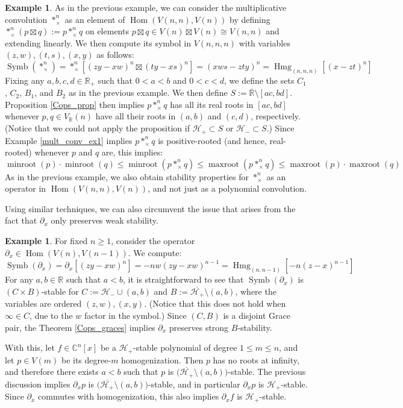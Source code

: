 \documentclass{article}
\theoremstyle{definition}
\newtheorem{example}[theorem]{Example}
\theoremstyle{plain}
\newcommand{\C}{\mathbb{C}}
\newcommand{\R}{\mathbb{R}}
\newcommand{\UHP}{\mathcal{H}_+}
\newcommand{\LHP}{\mathcal{H}_-}
\DeclareMathOperator{\Hmg}{Hmg}
\DeclareMathOperator{\Symb}{Symb}
\DeclareMathOperator{\Hom}{Hom}
\DeclareMathOperator{\maxroot}{maxroot}
\DeclareMathOperator{\minroot}{minroot}
\begin{document}
\begin{example}
    As in the previous example, we can consider the multiplicative convolution $*_\times^n$ as an element of $\Hom(V(n,n),V(n))$ by defining $*_\times^n(p \boxtimes q) := p *_\times^n q$ on elements $p \boxtimes q \in V(n) \boxtimes V(n) \cong V(n,n)$ and extending linearly. We then compute its symbol in $V(n,n,n)$ with variables $(z,w),(t,s),(x,y)$ as follows:
    \[
        \Symb(*_\times^n) = *_\times^n\left[(zy-xw)^n \boxtimes (ty-xs)^n\right] = (xws - zty)^n = \Hmg_{(n,n,n)}\left[(x-zt)^n\right]
    \]
    Fixing any $a,b,c,d \in \R_+$ such that $0<a<b$ and $0<c<d$, we define the sets $C_1$, $C_2$, $B_1$, and $B_2$ as in the previous example. We then define $S := \overline{\R} \setminus [ac, bd]$. Proposition \ref{Cops_prop} then implies $p *_\times^n q$ has all its real roots in $[ac,bd]$ whenever $p,q \in V_\R(n)$ have all their roots in $(a,b)$ and $(c,d)$, respectively. (Notice that we could not apply the proposition if $\UHP \subset S$ or $\LHP \subset S$.) Since Example \ref{mult_conv_ex1} implies $p *_\times^n q$ is positive-rooted (and hence, real-rooted) whenever $p$ and $q$ are, this implies:
    \[
        \minroot(p) \cdot \minroot(q) \leq \minroot(p *_\times^n q) \leq \maxroot(p *_\times^n q) \leq \maxroot(p) \cdot \maxroot(q)
    \]
    As in the previous example, we also obtain stability properties for $*_\times^n$ as an operator in $\Hom(V(n,n),V(n))$, and not just as a polynomial convolution.
\end{example}

Using similar techniques, we can also circumvent the issue that arises from the fact that $\partial_x$ only preserves weak stability.

\begin{example}\label{deriv_ex}
    For fixed $n \geq 1$, consider the operator $\partial_x \in \Hom(V(n),V(n-1))$. We compute:
    \[
        \Symb(\partial_x) = \partial_x[(zy-xw)^n] = -nw(zy-xw)^{n-1} = \Hmg_{(n,n-1)}\left[-n(z-x)^{n-1}\right]
    \]
    For any $a,b \in \R$ such that $a<b$, it is straightforward to see that $\Symb(\partial_x)$ is $(C \times B)$-stable for $C := \LHP \cup (a,b)$ and $B := \overline{\UHP} \setminus (a,b)$, where the variables are ordered $(z,w),(x,y)$. (Notice that this does not hold when $\infty \in C$, due to the $w$ factor in the symbol.) Since $(C,B)$ is a disjoint Grace pair, the Theorem \ref{Cops_graces} implies $\partial_x$ preserves strong $B$-stability.
    
    With this, let $f \in \C^n[x]$ be a $\UHP$-stable polynomial of degree $1 \leq m \leq n$, and let $p \in V(m)$ be its degree-$m$ homogenization. Then $p$ has no roots at infinity, and therefore there exists $a < b$ such that $p$ is $\big(\overline{\UHP} \setminus (a,b)\big)$-stable. The previous discussion implies $\partial_x p$ is $\big(\overline{\UHP} \setminus (a,b)\big)$-stable, and in particular $\partial_x p$ is $\UHP$-stable. Since $\partial_x$ commutes with homogenization, this also implies $\partial_x f$ is $\UHP$-stable.
\end{example}
\end{document}
